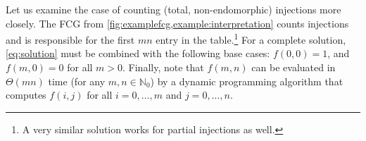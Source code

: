 Let us examine the case of counting (total, non-endomorphic) injections more
closely. The FCG from \cref{fig:examplefcg,example:interpretation} counts
injections and is responsible for the first $mn$ entry in the table.\footnote{A
  very similar solution works for partial injections as well.} For a complete
solution, \cref{eq:solution} must be combined with the following base cases:
$f(0, 0) = 1$, and $f(m, 0) = 0$ for all $m > 0$. Finally, note that $f(m, n)$
can be evaluated in $\Theta(mn)$ time (for any $m, n \in \mathbb{N}_{0}$) by a
dynamic programming algorithm that computes $f(i, j)$ for all $i = 0, \dots, m$
and $j = 0, \dots, n$.



